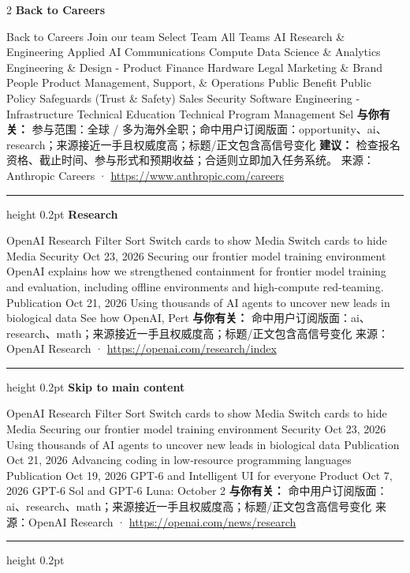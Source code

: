 \documentclass[10.5pt]{ctexart}
\begin{document}
\begin{multicols}{2}
{\large\bfseries Back to Careers}\par
Back to Careers Join our team Select Team All Teams AI Research \& Engineering Applied AI Communications Compute Data Science \& Analytics Engineering \& Design - Product Finance Hardware Legal Marketing \& Brand People Product Management, Support, \& Operations Public Benefit Public Policy Safeguards (Trust \& Safety) Sales Security Software Engineering - Infrastructure Technical Education Technical Program Management Sel
\textbf{与你有关：} 参与范围：全球 / 多为海外全职；命中用户订阅版面：opportunity、ai、research；来源接近一手且权威度高；标题/正文包含高信号变化
\textbf{建议：} 检查报名资格、截止时间、参与形式和预期收益；合适则立即加入任务系统。
{\footnotesize\color{ormuted} 来源：Anthropic Careers · \url{https://www.anthropic.com/careers}}
\vspace{2mm}
\hrule height 0.2pt
\vspace{2mm}
{\large\bfseries Research}\par
OpenAI Research Filter Sort Switch cards to show Media Switch cards to hide Media Security Oct 23, 2026 Securing our frontier model training environment OpenAI explains how we strengthened containment for frontier model training and evaluation, including offline environments and high-compute red-teaming. Publication Oct 21, 2026 Using thousands of AI agents to uncover new leads in biological data See how OpenAI, Pert
\textbf{与你有关：} 命中用户订阅版面：ai、research、math；来源接近一手且权威度高；标题/正文包含高信号变化
{\footnotesize\color{ormuted} 来源：OpenAI Research · \url{https://openai.com/research/index}}
\vspace{2mm}
\hrule height 0.2pt
\vspace{2mm}
{\large\bfseries Skip to main content}\par
OpenAI Research Filter Sort Switch cards to show Media Switch cards to hide Media Securing our frontier model training environment Security Oct 23, 2026 Using thousands of AI agents to uncover new leads in biological data Publication Oct 21, 2026 Advancing coding in low‑resource programming languages Publication Oct 19, 2026 GPT-6 and Intelligent UI for everyone Product Oct 7, 2026 GPT‑6 Sol and GPT‑6 Luna: October 2
\textbf{与你有关：} 命中用户订阅版面：ai、research、math；来源接近一手且权威度高；标题/正文包含高信号变化
{\footnotesize\color{ormuted} 来源：OpenAI Research · \url{https://openai.com/news/research}}
\vspace{2mm}
\hrule height 0.2pt

\end{multicols}
\end{document}
